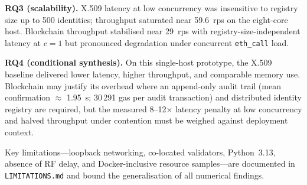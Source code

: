\textbf{RQ3 (scalability).} X.509 latency at low concurrency was insensitive to registry size up to 500 identities; throughput saturated near 59.6~rps on the eight-core host. Blockchain throughput stabilised near 29~rps with registry-size-independent latency at $c=1$ but pronounced degradation under concurrent \texttt{eth\_call} load.

\textbf{RQ4 (conditional synthesis).} On this single-host prototype, the X.509 baseline delivered lower latency, higher throughput, and comparable memory use. Blockchain may justify its overhead where an append-only audit trail (mean confirmation $\approx$ 1.95~s; 30\,291 gas per audit transaction) and distributed identity registry are required, but the measured 8--12$\times$ latency penalty at low concurrency and halved throughput under contention must be weighed against deployment context.

Key limitations---loopback networking, co-located validators, Python~3.13, absence of RF delay, and Docker-inclusive resource samples---are documented in \texttt{LIMITATIONS.md} and bound the generalisation of all numerical findings.
